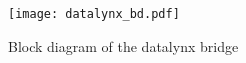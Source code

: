 \documentclass[../bachelor_paper.tex]{subfiles}
\begin{document}
\begin{figure}
    \centering
    \texttt{[image: datalynx\_bd.pdf]}
    \caption{Block diagram of the datalynx bridge}
    \label{fig:arch/comm/block}
\end{figure}

\isstandalone



\fi
\end{document}
